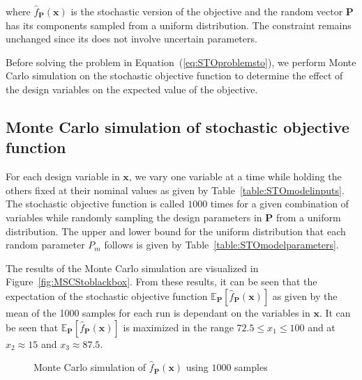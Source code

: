 where $\hat{f}_{\mathbf{P}}(\mathbf{x})$ is the stochastic version of the objective and the random vector $\mathbf{P}$ has its components sampled from a uniform distribution. The constraint remains unchanged since its does not involve uncertain parameters.

Before solving the problem in Equation~(\ref{eq:STOproblemsto}), we perform Monte Carlo simulation on the stochastic objective function to determine the effect of the design variables on the expected value of the objective.

\subsection{Monte Carlo simulation of stochastic objective function} \label{subsec:MCSsto}


For each design variable in $\mathbf{x}$, we vary one variable at a time while holding the others fixed at their nominal values as given by Table~\ref{table:STOmodelinputs}. The stochastic objective function is called $1000$ times for a given combination of variables while randomly sampling the design parameters in $\mathbf{P}$ from a uniform distribution. The upper and lower bound for the uniform distribution that each random parameter $P_m$ follows is given by Table~\ref{table:STOmodelparameters}.

The results of the Monte Carlo simulation are visualized in Figure~\ref{fig:MSCStoblackbox}. From these results, it can be seen that the expectation of the stochastic objective function $\mathbb{E}_{\mathbf{P}}\left[\hat{f}_{\mathbf{P}}(\mathbf{x})\right]$ as given by the mean of the 1000 samples for each run is dependant on the variables in $\mathbf{x}$. It can be seen that $\mathbb{E}_{\mathbf{P}}\left[\hat{f}_{\mathbf{P}}(\mathbf{x})\right]$ is maximized in the range $ 72.5 \le x_1 \le 100 $ and at $x_2 \approx 15$ and $x_3 \approx 87.5$.

\begin{figure}[h!]
	\centering
	
	\caption[]{Monte Carlo simulation of $\hat{f}_{\mathbf{P}}(\mathbf{x})$ using $1000$ samples}
\end{figure}

